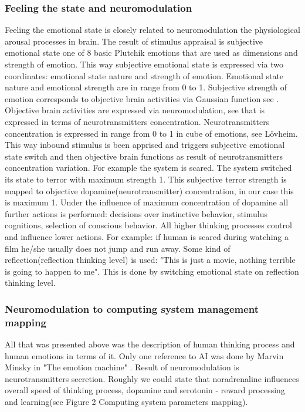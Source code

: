 \subsubsection{Feeling the state and neuromodulation}

Feeling the emotional state is closely related to neuromodulation the physiological arousal processes in brain. The result of stimulus appraisal is subjective emotional state one of 8 basic Plutchik emotions that are used as dimensions and strength of emotion. This way subjective emotional state is expressed via two coordinates: emotional state nature and strength of emotion. Emotional state nature and emotional strength are in range from 0 to 1. Subjective strength of emotion corresponds to objective brain activities via Gaussian function see \cite{hourglass}. Objective brain activities are expressed via neuromodulation, see \cite{emotionsbraintorobot} that is expressed in terms of neurotransmitters concentration. Neurotransmitters  concentration is expressed in range from 0 to 1 in cube of emotions, see L\"{o}vheim\cite{cubeofemotions}. This way inbound stimulus is been apprised and triggers subjective emotional state switch and then objective brain functions as result of neurotransmitters concentration variation. For example the system is scared. The system switched its state to terror with maximum strength 1. This subjective terror strength is mapped to objective dopamine(neurotransmitter) concentration, in our case this is maximum 1. Under the influence of maximum concentration of dopamine all further actions is performed: decisions over instinctive behavior, stimulus cognitions, selection of conscious behavior. All higher thinking processes control and influence lower actions. For example: if human is scared during watching a film he/she usually does not jump and run away. Some kind of reflection(reflection thinking level) is used: "This is just a movie, nothing terrible is going to happen to me". This is done by switching emotional state on reflection thinking level.

\subsubsection{Neuromodulation to computing system management mapping}

All that was presented above was the description of human thinking process and human emotions in terms of it. Only one reference to AI was done by Marvin Minsky in "The emotion machine" \cite{emotionmachine}. Result of neuromodulation is neurotransmitters secretion. Roughly we could state that noradrenaline influences overall speed of thinking process, dopamine and serotonin - reward processing and learning(see Figure 2 Computing system parameters mapping).

